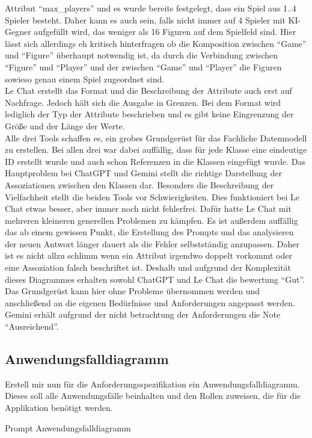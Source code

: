 Attribut ``max\_players'' und es wurde bereits festgelegt, dass ein Spiel aus 1..4 Spieler besteht. Daher kann es auch sein, falls nicht immer auf 4 Spieler mit KI-Gegner aufgefüllt 
wird, das weniger als 16 Figuren auf dem Spielfeld sind. Hier lässt sich allerdings eh kritisch hinterfragen ob die Komposition zwischen ``Game'' und ``Figure'' überhaupt 
notwendig ist, da durch die Verbindung zwischen ``Figure'' und ``Player'' und der zwischen ``Game'' und ``Player'' die Figuren sowieso genau einem Spiel zugeordnet sind.\\
Le Chat erstellt das Format und die Beschreibung der Attribute auch erst auf Nachfrage. Jedoch hält sich die Ausgabe in Grenzen. Bei dem Format wird lediglich der Typ der
Attribute beschrieben und es gibt keine Eingrenzung der Größe und der Länge der Werte.\\

Alle drei Tools schaffen es, ein grobes Grundgerüst für das Fachliche Datenmodell zu erstellen. Bei allen drei war dabei auffällig, dass für jede Klasse eine 
eindeutige ID erstellt wurde und auch schon Referenzen in die Klassen eingefügt wurde. Das Hauptproblem bei ChatGPT und Gemini stellt die richtige Darstellung der 
Assoziationen zwischen den Klassen dar. Besonders die Beschreibung der Vielfachheit stellt die beiden Tools vor Schwierigkeiten. Dies funktioniert bei Le Chat etwas besser, 
aber immer noch nicht fehlerfrei. Dafür hatte Le Chat mit mehreren kleineren generellen Problemen zu kämpfen. Es ist außerdem auffällig das ab einem gewissen 
Punkt, die Erstellung des Prompts und das analysieren der neuen Antwort länger dauert als die Fehler selbstständig anzupassen. Daher ist es nicht allzu schlimm 
wenn ein Attribut irgendwo doppelt vorkommt oder eine Assoziation falsch beschriftet ist. Deshalb und aufgrund der Komplexität dieses Diagrammes erhalten 
sowohl ChatGPT und Le Chat die bewertung ``Gut''. Das Grundgerüst kann hier ohne Probleme übernommen werden und anschließend an die eigenen Bedürfnisse 
und Anforderungen angepasst werden. Gemini erhält aufgrund der nicht betrachtung der Anforderungen die Note ``Ausreichend''.


\subsection*{Anwendungsfalldiagramm}

\begin{prompt}[H]
    \begin{tcolorbox}[colback=gray!20, colframe=gray!20, boxrule=0pt, sharp corners] 
        Erstell mir nun für die Anforderungsspezifikation ein Anwendungsfalldiagramm. Dieses soll alle Anwendungsfälle beinhalten und den Rollen zuweisen, die für die 
        Applikation benötigt werden.
        \vfill
    \end{tcolorbox}
    \caption{Prompt Anwendungsfalldiagramm}
    \label{Prompt Anwendungsfalldiagramm}
\end{prompt}

